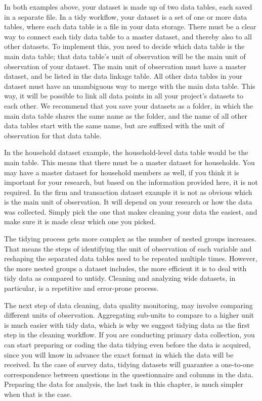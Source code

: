 In both examples above, your dataset is made up of two data tables,
each saved in a separate file.
In a tidy workflow, your dataset is a set of one or more data tables,
where each data table is a file in your data storage.
There must be a clear way to connect each
tidy data table to a master dataset,
and thereby also to all other datasets.
To implement this, you need to decide which data table is the main data table;
that data table's unit of observation will be
the main unit of observation of your dataset.
The main unit of observation must have a master dataset,
and be listed in the data linkage table.
All other data tables in your dataset must have
an unambiguous way to merge with the main data table.
This way, it will be possible to link
all data points in all your project's datasets to each other.
We recommend that you save your datasets as a folder,
in which the main data table shares the same name as the folder,
and the name of all other data tables start with the same name,
but are suffixed with the unit of observation for that data table.

In the household dataset example, 
the household-level data table would be the main table.
This means that there must be a master dataset for households.
You may have a master dataset for household members as well,
if you think it is important for your research,
but based on the information provided here,
it is not required.
In the firm and transaction dataset example
it is not as obvious which is the main unit of observation.
It will depend on your research or how the data was collected.
Simply pick the one that makes cleaning your data the easiest,
and make sure it is made clear which one you picked.

The tidying process gets more complex as the number of nested groups increases.
That means the steps of identifying the unit of observation of each variable
and reshaping the separated data tables need to be repeated multiple times.
However, the more nested groups a dataset includes,
the more efficient it is to deal with tidy data as compared to untidy.
Cleaning and analyzing wide datasets, in particular,
is a repetitive and error-prone process.

The next step of data cleaning, data quality monitoring,
may involve comparing different units of observation.
Aggregating sub-units to compare to a higher unit is much easier with tidy data,
which is why we suggest tidying data as the first step in the cleaning workflow.
If you are conducting primary data collection,
you can start preparing or coding the data tidying even before the data is acquired,
since you will know in advance the exact format in which the data will be received.
In the case of survey data,
tidying datasets will guarantee a one-to-one correspondence
between questions in the questionnaire and columns in the data.
Preparing the data for analysis, the last task in this chapter,
is much simpler when that is the case.

